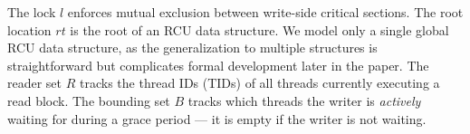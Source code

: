 The lock $l$ enforces mutual exclusion between write-side critical sections.
The root location $rt$ is the root of  an \textsf{RCU} data structure. We model only a single global RCU data structure, as the generalization to multiple structures is straightforward but complicates formal development later in the paper.
The reader set $R$ tracks the thread IDs (TIDs) of all threads currently executing a read block. 
The bounding set $B$ tracks which threads the writer is \emph{actively} waiting for during a grace period --- it is empty if the writer is not waiting.
\begin{comment}\begin{figure*}\scriptsize
  \meta
\caption{Programming Language}
\label{fig:plang}
\vspace{-2mm}
  \end{figure*}%
\end{comment}
